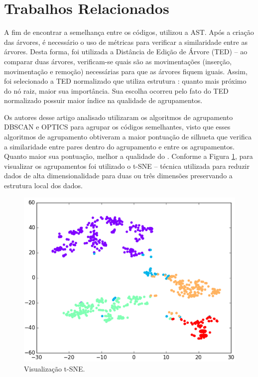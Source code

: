 	\section{Trabalhos Relacionados}
	\label{sec:TrabRel}
	
	    A fim de encontrar a semelhança entre os códigos, 
	    utilizou a AST. Após a criação das árvores, é necessário o uso de métricas
	    para verificar a similaridade entre as árvores. Desta forma, foi utilizada
	    a Distância de Edição de Árvore (TED) – ao comparar duas árvores, verificam-se
	    quais são as movimentações (inserção, movimentação e remoção) necessárias
	    para que as árvores fiquem iguais. Assim, foi selecionado a TED normalizado
	    que utiliza estrutura : quanto mais próximo do nó raiz,
	    maior sua importância. Sua escolha ocorreu pelo fato do TED normalizado
	    possuir maior índice na qualidade de agrupamentos.
	    
	    Os autores desse artigo analisado utilizaram os algoritmos de agrupamento
	    DBSCAN \cite{Ester1996} e OPTICS \cite{Ankerst1999} para agrupar os códigos
	    semelhantes, visto que esses algoritmos de agrupamento obtiveram a maior
	    pontuação de silhueta que verifica a similaridade entre pares dentro do
	    agrupamento e entre os agrupamentos. Quanto maior sua pontuação, melhor a
	    qualidade do . Conforme a Figura \ref{fig:t-SNE}, para
	    visualizar os agrupamentos foi utilizado o t-SNE \cite{maaten2008} – técnica
	    utilizada para reduzir dados de alta dimensionalidade para duas ou três
	    dimensões preservando a estrutura local dos dados.
	    
	    \begin{figure}[ht]
	        \centering
	        \includegraphics[scale=0.5]{imagem/visualizacao-tSNE.png}
	        \captionsetup{justification=centering}
	        \caption{Visualização t-SNE.}
	        \label{fig:t-SNE}
	    \end{figure}
	    
